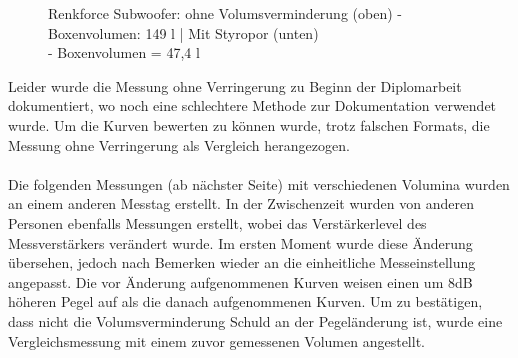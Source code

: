 \begin{figure} [H]
	\centering
	\quad
	\caption{Renkforce Subwoofer: ohne Volumsverminderung (oben) - Boxenvolumen: 149 l | Mit Styropor (unten)\\- Boxenvolumen = 47,4 l}
	\label{fig:4.4.2.1}
\end{figure}

Leider wurde die Messung ohne Verringerung zu Beginn der Diplomarbeit dokumentiert, wo noch eine schlechtere Methode zur Dokumentation verwendet wurde.
Um die Kurven bewerten zu können wurde, trotz falschen Formats, die Messung ohne Verringerung als Vergleich herangezogen.\\ \\

Die folgenden Messungen (ab nächster Seite) mit verschiedenen Volumina wurden an einem anderen Messtag erstellt.
In der Zwischenzeit wurden von anderen Personen ebenfalls Messungen erstellt, wobei das Verstärkerlevel des Messverstärkers verändert wurde.
Im ersten Moment wurde diese Änderung übersehen, jedoch nach Bemerken wieder an die einheitliche Messeinstellung angepasst.
Die vor Änderung aufgenommenen Kurven weisen einen um 8dB höheren Pegel auf als die danach aufgenommenen Kurven.
Um zu bestätigen, dass nicht die Volumsverminderung Schuld an der Pegeländerung ist, wurde eine Vergleichsmessung mit einem zuvor gemessenen Volumen angestellt.\\


